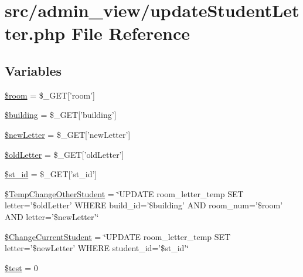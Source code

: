 \hypertarget{updateStudentLetter_8php}{\section{src/admin\-\_\-view/update\-Student\-Letter.php \-File \-Reference}
\label{updateStudentLetter_8php}
}
\subsection*{\-Variables}
\begin{DoxyCompactItemize}
\item 
\hyperlink{updateStudentLetter_8php_ab285a2e759ea45a70f8ff40a63d2fe89}{\$room} = \$\-\_\-\-G\-E\-T\mbox{[}'room'\mbox{]}
\item 
\hyperlink{updateStudentLetter_8php_a903ab1c50249715a442ce81e6d5ba775}{\$building} = \$\-\_\-\-G\-E\-T\mbox{[}'building'\mbox{]}
\item 
\hyperlink{updateStudentLetter_8php_ad5ac878e93fc1bef0c50e99e53515c4d}{\$new\-Letter} = \$\-\_\-\-G\-E\-T\mbox{[}'new\-Letter'\mbox{]}
\item 
\hyperlink{updateStudentLetter_8php_a41c33048ffcf05119d1162b4a317b806}{\$old\-Letter} = \$\-\_\-\-G\-E\-T\mbox{[}'old\-Letter'\mbox{]}
\item 
\hyperlink{updateStudentLetter_8php_ab68b86e23fd74e101c03130a49b24f66}{\$st\-\_\-id} = \$\-\_\-\-G\-E\-T\mbox{[}'st\-\_\-id'\mbox{]}
\item 
\hyperlink{updateStudentLetter_8php_a7f985a3a1771038a28cc4019ea3b818e}{\$\-Temp\-Change\-Other\-Student} = \char`\"{}\-U\-P\-D\-A\-T\-E room\-\_\-letter\-\_\-temp \-S\-E\-T letter='\$old\-Letter' \-W\-H\-E\-R\-E build\-\_\-id='\$building' \-A\-N\-D room\-\_\-num='\$room' \-A\-N\-D letter='\$new\-Letter'\char`\"{}
\item 
\hyperlink{updateStudentLetter_8php_a5028b950af91c1e21a8e47bf6bd2f480}{\$\-Change\-Current\-Student} = \char`\"{}\-U\-P\-D\-A\-T\-E room\-\_\-letter\-\_\-temp \-S\-E\-T letter='\$new\-Letter' \-W\-H\-E\-R\-E student\-\_\-id='\$st\-\_\-id'\char`\"{}
\item 
\hyperlink{updateStudentLetter_8php_a31daebf88fc668f410293e2c70cea3fc}{\$test} = 0
\end{DoxyCompactItemize}


